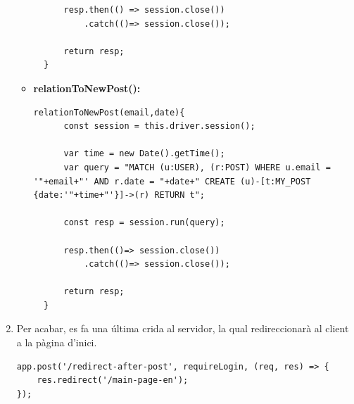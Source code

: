 \documentclass[11pt,catalan,listoffigures,listoftables]{tfgetsinf}
\begin{document}
\begin{enumerate}
\begin{itemize}
\begin{lstlisting}
      resp.then(() => session.close())
          .catch(()=> session.close());

      return resp;
  }
\end{lstlisting}
\item \textbf{relationToNewPost():}
\begin{lstlisting}
relationToNewPost(email,date){
      const session = this.driver.session();

      var time = new Date().getTime();
      var query = "MATCH (u:USER), (r:POST) WHERE u.email = '"+email+"' AND r.date = "+date+" CREATE (u)-[t:MY_POST {date:'"+time+"'}]->(r) RETURN t";

      const resp = session.run(query);

      resp.then(()=> session.close())
          .catch(()=> session.close());

      return resp;
  }
\end{lstlisting}
\end{itemize}
\item Per acabar, es fa una última crida al servidor, la qual redireccionarà al client a la pàgina d'inici.
\begin{lstlisting}
app.post('/redirect-after-post', requireLogin, (req, res) => {
    res.redirect('/main-page-en');
});
\end{lstlisting}
\end{enumerate}
\end{document}
